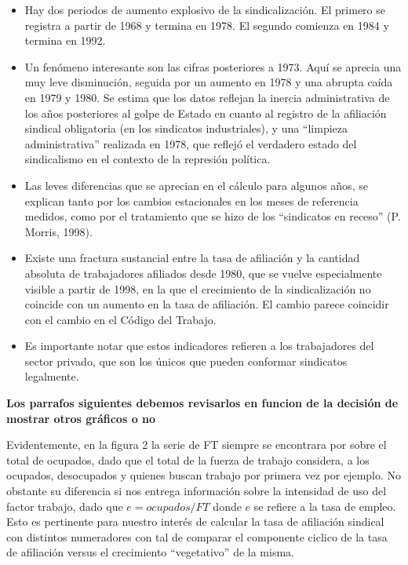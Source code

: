 \documentclass[
]{article}
\begin{document}
\begin{itemize}
\item
  Hay dos periodos de aumento explosivo de la sindicalización. El
  primero se registra a partir de 1968 y termina en 1978. El segundo
  comienza en 1984 y termina en 1992.
\item
  Un fenómeno interesante son las cifras posteriores a 1973. Aquí se
  aprecia una muy leve disminución, seguida por un aumento en 1978 y una
  abrupta caída en 1979 y 1980. Se estima que los datos reflejan la
  inercia administrativa de los años posteriores al golpe de Estado en
  cuanto al registro de la afiliación sindical obligatoria (en los
  sindicatos industriales), y una ``limpieza administrativa'' realizada
  en 1978, que reflejó el verdadero estado del sindicalismo en el
  contexto de la represión política.
\item
  Las leves diferencias que se aprecian en el cálculo para algunos años,
  se explican tanto por los cambios estacionales en los meses de
  referencia medidos, como por el tratamiento que se hizo de los
  ``sindicatos en receso'' (P. Morris, 1998).
\item
  Existe una fractura sustancial entre la tasa de afiliación y la
  cantidad absoluta de trabajadores afiliados desde 1980, que se vuelve
  especialmente visible a partir de 1998, en la que el crecimiento de la
  sindicalización no coincide con un aumento en la tasa de afiliación.
  El cambio parece coincidir con el cambio en el Código del Trabajo.
\item
  Es importante notar que estos indicadores refieren a los trabajadores
  del sector privado, que son los únicos que pueden conformar sindicatos
  legalmente.
\end{itemize}

\textbf{Los parrafos siguientes debemos revisarlos en funcion de la
decisión de mostrar otros gráficos o no}

Evidentemente, en la figura 2 la serie de FT siempre se encontrara por
sobre el total de ocupados, dado que el total de la fuerza de trabajo
considera, a los ocupados, desocupados y quienes buscan trabajo por
primera vez por ejemplo. No obstante su diferencia si nos entrega
información sobre la intensidad de uso del factor trabajo, dado que
\(e=ocupados/FT\) donde \(e\) se refiere a la tasa de empleo. Esto es
pertinente para nuestro interés de calcular la tasa de afiliación
sindical con distintos numeradores con tal de comparar el componente
ciclico de la tasa de afiliación versus el crecimiento ``vegetativo'' de
la misma.
\end{document}
